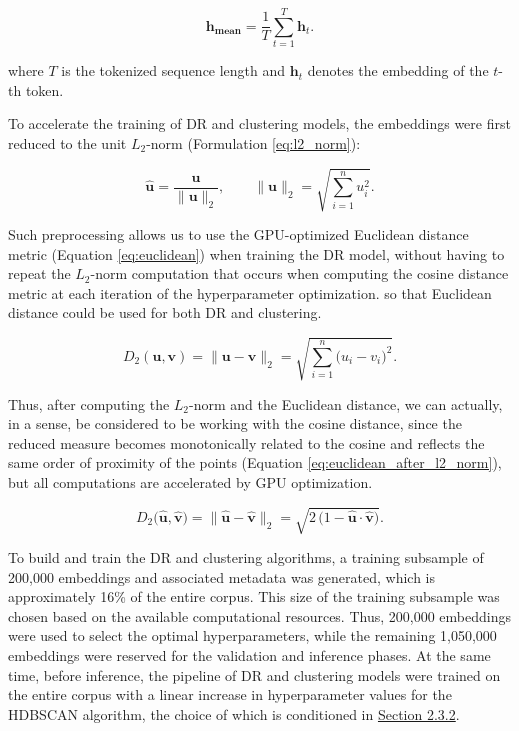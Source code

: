 \begin{equation}\label{eq:mean_pooling}
    \mathbf{h_{mean}}=\frac{1}{T}\sum^T_{t=1}\mathbf{h}_{t}.
\end{equation}

where $T$ is the tokenized sequence length and $\mathbf{h}_t$ denotes the embedding of the $t$-th token.

To accelerate the training of DR and clustering models, the embeddings were
first reduced to the unit $L_2$-norm (Formulation \ref{eq:l2_norm}):

\begin{equation}\label{eq:l2_norm}
    \widehat{\mathbf{u}}
    = \frac{\mathbf{u}}{\|\mathbf{u}\|_2},
    \qquad
    \|\mathbf{u}\|_2 = \sqrt{\sum_{i=1}^{n} u_i^2}.
\end{equation}

Such preprocessing allows us to use the GPU-optimized Euclidean distance metric (Equation \ref{eq:euclidean})
when training the DR model, without having to repeat the $L_2$-norm computation that
occurs when computing the cosine distance metric at each iteration of the hyperparameter optimization.
so that Euclidean distance could be used for both DR and clustering.

\begin{equation}\label{eq:euclidean}
    D_{2}(\mathbf{u}, \mathbf{v})
    = \|\mathbf{u} - \mathbf{v}\|_2
    = \sqrt{\sum_{i=1}^{n} \bigl(u_i - v_i\bigr)^2}.
\end{equation}

Thus, after computing the $L_2$-norm and the Euclidean distance, we can actually, in a sense, be considered
to be working with the cosine distance, since the reduced measure becomes monotonically related to the cosine
and reflects the same order of proximity of the points (Equation \ref{eq:euclidean_after_l2_norm}), but all
computations are accelerated by GPU optimization.

\begin{equation}\label{eq:euclidean_after_l2_norm}
    D_{2}\bigl(\widehat{\mathbf{u}}, \widehat{\mathbf{v}}\bigr)
    = \bigl\|\widehat{\mathbf{u}} - \widehat{\mathbf{v}}\bigr\|_2
    = \sqrt{2\,\bigl(1 - \widehat{\mathbf{u}}\!\cdot\!\widehat{\mathbf{v}}\bigr)}.
\end{equation}

To build and train the DR and clustering algorithms, a training subsample of 200,000 embeddings
and associated metadata was generated, which is approximately 16\% of the entire corpus. This size of the training
subsample was chosen based on the available computational resources. Thus, 200,000 embeddings were used to select
the optimal hyperparameters, while the remaining 1,050,000 embeddings were reserved for the validation and inference
phases. At the same time, before inference, the pipeline of DR and clustering models were trained
on the entire corpus with a linear increase in hyperparameter values for the HDBSCAN algorithm, the choice of which
is conditioned in \hyperref[sec:drc]{Section 2.3.2}.

